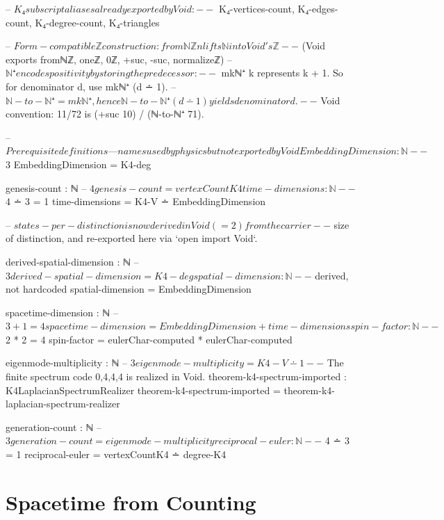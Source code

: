 \documentclass[11pt,a4paper]{book}
\begin{document}
\begin{code}
-- $ K₄ subscript aliases already exported by Void:
-- $ K₄-vertices-count, K₄-edges-count, K₄-degree-count, K₄-triangles

-- $ Form-compatible ℤ construction: fromℕℤ n lifts ℕ into Void's ℤ
-- $ (Void exports fromℕℤ, oneℤ, 0ℤ, +suc, -suc, normalizeℤ)
-- $ ℕ⁺ encodes positivity by storing the predecessor:
-- $ mkℕ⁺ k represents k + 1.  So for denominator d, use mkℕ⁺ (d ∸ 1).
-- $ ℕ-to-ℕ⁺ = mkℕ⁺, hence ℕ-to-ℕ⁺ (d ∸ 1) yields denominator d.
-- $ Void convention: 11/72 is (+suc 10) / (ℕ-to-ℕ⁺ 71).

-- $ Prerequisite definitions — names used by physics but not exported by Void

EmbeddingDimension : ℕ
-- $ 3
EmbeddingDimension = K4-deg

genesis-count : ℕ
-- $ 4
genesis-count = vertexCountK4

time-dimensions : ℕ
-- $ 4 ∸ 3 = 1
time-dimensions = K4-V ∸ EmbeddingDimension

-- $ states-per-distinction is now derived in Void (= 2) from the carrier
-- $ size of distinction, and re-exported here via `open import Void`.

derived-spatial-dimension : ℕ
-- $ 3
derived-spatial-dimension = K4-deg

spatial-dimension : ℕ
-- $ derived, not hardcoded
spatial-dimension = EmbeddingDimension

spacetime-dimension : ℕ
-- $ 3 + 1 = 4
spacetime-dimension = EmbeddingDimension + time-dimensions

spin-factor : ℕ
-- $ 2 * 2 = 4
spin-factor = eulerChar-computed * eulerChar-computed

eigenmode-multiplicity : ℕ
-- $ 3
eigenmode-multiplicity = K4-V ∸ 1

-- $ The finite spectrum code {0,4,4,4} is realized in Void.
theorem-k4-spectrum-imported : K4LaplacianSpectrumRealizer
theorem-k4-spectrum-imported = theorem-k4-laplacian-spectrum-realizer

generation-count : ℕ
-- $ 3
generation-count = eigenmode-multiplicity

reciprocal-euler : ℕ
-- $ 4 ∸ 3 = 1
reciprocal-euler = vertexCountK4 ∸ degree-K4
\end{code}

\section{Spacetime from Counting}
\end{document}
